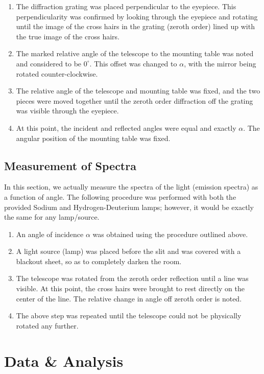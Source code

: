 \documentclass[paper=a4, fontsize=11pt]{scrartcl} %
\numberwithin{equation}{section}
\numberwithin{figure}{section}
\numberwithin{table}{section}
\begin{document}
\begin{enumerate}
\item The diffraction grating was placed perpendicular to the eyepiece. This perpendicularity was confirmed by looking through the eyepiece and rotating until the image of the cross hairs in the grating (zeroth order) lined up with the true image of the cross hairs.
\item The marked relative angle of the telescope to the mounting table was noted and considered to be $0^\circ$. This offset was changed to $\alpha$, with the mirror being rotated counter-clockwise.
\item The relative angle of the telescope and mounting table was fixed, and the two pieces were moved together until the zeroth order diffraction off the grating was visible through the eyepiece.
\item At this point, the incident and reflected angles were equal and exactly $\alpha$. The angular position of the mounting table was fixed.
\end{enumerate}


\subsection{Measurement of Spectra}
In this section, we actually measure the spectra of the light (emission spectra) as a function of angle. The following procedure was performed with both the provided Sodium and Hydrogen-Deuterium lamps; however, it would be exactly the same for any lamp/source.

\begin{enumerate}
\item An angle of incidence $\alpha$ was obtained using the procedure outlined above.
\item A light source (lamp) was placed before the slit and was covered with a blackout sheet, so as to completely darken the room.
\item The telescope was rotated from the zeroth order reflection until a line was visible. At this point, the cross hairs were brought to rest directly on the center of the line. The relative change in angle off zeroth order is noted.
\item The above step was repeated until the telescope could not be physically rotated any further.
\end{enumerate}




\section{Data \& Analysis}
\end{document}
